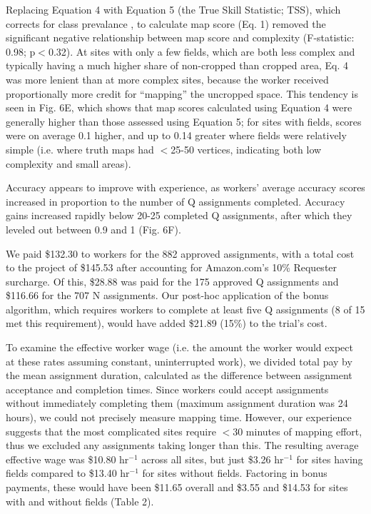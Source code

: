 \documentclass[preprint,12pt,authoryear]{elsarticle}
\begin{document}
Replacing Equation 4 with Equation 5 (the True Skill Statistic; TSS), which corrects for class prevalance  \citep{allouche_assessing_2006}, to calculate map score (Eq. 1) removed the significant negative relationship between map score and complexity (F-statistic: 0.98; p$<$0.32). At sites with only a few fields, which are both less complex and typically having a much higher share of non-cropped than cropped area, Eq. 4 was more lenient than at more complex sites, because the worker received proportionally more credit for ``mapping'' the uncropped space.  This tendency is seen in Fig. 6E, which shows that map scores calculated using Equation 4 were generally higher than those assessed using Equation 5; for sites with fields, scores were on average 0.1 higher, and up to 0.14 greater where fields were relatively simple (i.e. where truth maps had $<$25-50 vertices, indicating both low complexity and small areas).

Accuracy appears to improve with experience, as workers' average accuracy scores increased in proportion to the number of Q assignments completed. Accuracy gains increased rapidly below 20-25 completed Q assignments, after which they leveled out between 0.9 and 1 (Fig. 6F).  


We paid \$132.30 to workers for the 882 approved assignments, with a total cost to the project of \$145.53 after accounting for Amazon.com's 10\% Requester surcharge. Of this, \$28.88 was paid for the 175 approved Q assignments and \$116.66 for the 707 N assignments.  Our post-hoc application of the bonus algorithm, which requires workers to complete at least five Q assignments (8 of 15 met this requirement), would have added \$21.89 (15\%) to the trial's cost. 

To examine the effective worker wage (i.e. the amount the worker would expect at these rates assuming constant, uninterrupted work), we divided total pay by the mean assignment duration, calculated as the difference between assignment acceptance and completion times. Since workers could accept assignments without immediately completing them (maximum assignment duration was 24 hours), we could not precisely measure mapping time. However, our experience suggests that the most complicated sites require $<$30 minutes of mapping effort, thus we excluded any assignments taking longer than this. The resulting average effective wage was \$10.80 hr$^{-1}$ across all sites, but just \$3.26 hr$^{-1}$ for sites having fields compared to \$13.40 hr$^{-1}$ for sites without fields.  Factoring in bonus payments, these would have been \$11.65 overall and \$3.55 and \$14.53 for sites with and without fields (Table 2). 
\end{document}
